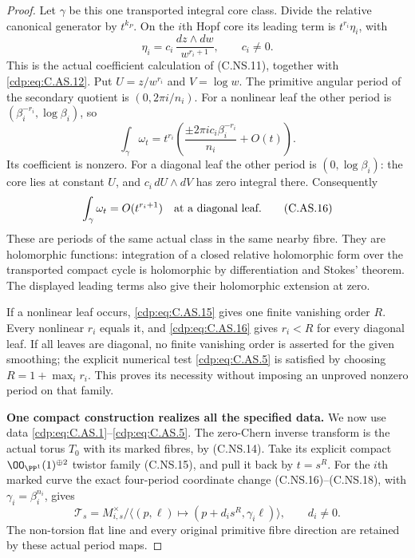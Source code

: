 \begin{proof}
Let $\gamma$ be this one transported
integral core class. Divide the relative
canonical generator by $t^{k_P}$.
On the $i$th Hopf core its leading
term is $t^{r_i}\eta_i$, with
\[
                   \eta_i=c_i\,\frac{dz\wedge dw}{w^{r_i+1}},
                          \qquad c_i\ne0.               \tag{C.AS.14}\label{cdp:eq:C.AS.14}
\]
This is the actual coefficient calculation
of (C.NS.11), together with \eqref{cdp:eq:C.AS.12}.
Put $U=z/w^{r_i}$ and $V=\log w$.
The primitive angular period of the
secondary quotient is $(0,2\pi i/n_i)$.
For a nonlinear leaf the other period is
$(\beta_i^{-r_i},\log\beta_i)$, so
\[
       \int_{\gamma}\omega_t
          =t^{r_i}\left(\frac{\pm2\pi i c_i\beta_i^{-r_i}}{n_i}
                         +O(t)\right).                 \tag{C.AS.15}\label{cdp:eq:C.AS.15}
\]
Its coefficient is nonzero. For a diagonal
leaf the other period is
$(0,\log\beta_i)$: the core lies at
constant $U$, and $c_i\,dU\wedge dV$
has zero integral there. Consequently
\[
                         \int_\gamma\omega_t=O(t^{r_i+1})
                  \quad\hbox{at a diagonal leaf}.        \tag{C.AS.16}\label{cdp:eq:C.AS.16}
\]
These are periods of the same actual
class in the same nearby fibre. They
are holomorphic functions: integration
of a closed relative holomorphic form
over the transported compact cycle is
holomorphic by differentiation and
Stokes' theorem. The displayed leading
terms also give their holomorphic
extension at zero.

If a nonlinear leaf occurs, \eqref{cdp:eq:C.AS.15}
gives one finite vanishing order $R$.
Every nonlinear $r_i$ equals it, and
\eqref{cdp:eq:C.AS.16} gives $r_i<R$ for every
diagonal leaf. If all leaves are
diagonal, no finite vanishing order
is asserted for the given smoothing;
the explicit numerical test \eqref{cdp:eq:C.AS.5}
is satisfied by choosing
$R=1+\max_i r_i$. This proves its
necessity without imposing an unproved
nonzero period on that family.

\par\medskip\noindent\textbf{One compact construction realizes all the specified data.}
We now use data \eqref{cdp:eq:C.AS.1}--\eqref{cdp:eq:C.AS.5}.
The zero-Chern inverse transform is
the actual torus $T_0$ with its marked
fibres, by (C.NS.14). Take its explicit
compact $\OO_{\PP^1}(1)^{\oplus2}$
twistor family (C.NS.15), and pull it
back by $t=s^R$. For the $i$th marked
curve the exact four-period coordinate
change (C.NS.16)--(C.NS.18), with
$\gamma_i=\beta_i^{n_i}$, gives
\[
 \mathcal T_s=M_{i,s}^{\times}/
   \langle(p,\ell)\mapsto(p+d_i s^R,\gamma_i\ell)\rangle,
                    \qquad d_i\ne0 .                  \tag{C.AS.17}\label{cdp:eq:C.AS.17}
\]
The non-torsion flat line and every
original primitive fibre direction
are retained by these actual period
maps.


\end{proof}

